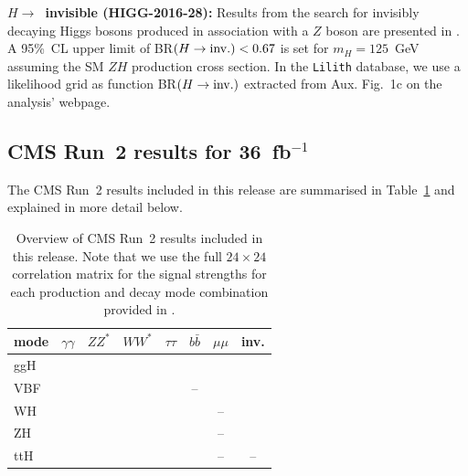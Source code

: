 {\bf\boldmath $H\to$~invisible (HIGG-2016-28):} 
Results from the search for invisibly decaying Higgs bosons produced in association with a $Z$ boson are presented in \cite{Aaboud:2017bja}. 
A 95\%~CL upper limit of BR$(H\to {\rm inv.})<0.67$ is set for $m_H= 125$~GeV assuming the SM $ZH$ production cross section. 
In the {\tt Lilith} database, 
we use a likelihood grid as function BR$(H\to {\rm inv.})$ extracted from Aux. Fig.~1c on the analysis' webpage. \\



\clearpage
\subsection{CMS Run~2 results for 36~fb$^{-1}$}

The CMS Run~2 results included in this release are summarised in Table~\ref{tab:CMSresults} and explained in more detail below.

\begin{table}[h]\centering
\begin{tabular}{l | ccccccc}
mode & $\gamma\gamma$ & $ZZ^*$ & $WW^*$ & $\tau\tau$ & $b\bar b$ & $\mu\mu$ & inv. \\
\hline
ggH & \cite{Sirunyan:2018koj} & \cite{Sirunyan:2018koj} & \cite{Sirunyan:2018koj} & \cite{Sirunyan:2018koj} & \cite{Sirunyan:2018koj} & \cite{Sirunyan:2018koj} & \cite{Sirunyan:2018owy} \\
VBF &  \cite{Sirunyan:2018koj} & \cite{Sirunyan:2018koj} & \cite{Sirunyan:2018koj} & \cite{Sirunyan:2018koj} &-- & \cite{Sirunyan:2018koj} & \cite{Sirunyan:2018owy} \\
WH &  \cite{Sirunyan:2018koj} & \cite{Sirunyan:2018koj} & \cite{Sirunyan:2018koj} & \cite{Sirunyan:2018cpi} & \cite{Sirunyan:2018koj} & -- & \cite{Sirunyan:2018owy} \\
ZH & \cite{Sirunyan:2018koj} & \cite{Sirunyan:2018koj} & \cite{Sirunyan:2018koj} & \cite{Sirunyan:2018cpi} & \cite{Sirunyan:2018koj} & -- & \cite{Sirunyan:2018owy} \\
ttH & \cite{Sirunyan:2018koj} & \cite{Sirunyan:2018koj} & \cite{Sirunyan:2018koj} & \cite{Sirunyan:2018koj} & \cite{Sirunyan:2018koj} & -- & -- \\
\end{tabular}
\caption{Overview of CMS Run~2 results included in this release. Note that we use the full $24\times 24$ correlation matrix 
for the signal strengths for each production and decay mode combination provided in \cite{Sirunyan:2018koj}.}
\label{tab:CMSresults}
\end{table}


